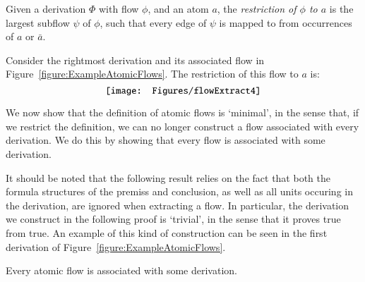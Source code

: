 
\begin{definition}\label{definiton:FlowRestriction}
Given a derivation $\Phi$ with flow $\phi$, and an atom $a$, the \emph{restriction of $\phi$ to $a$} is the largest subflow $\psi$ of $\phi$, such that every edge of $\psi$ is mapped to from occurrences of $a$ or $\bar a$.
\end{definition}

\begin{example}
Consider the rightmost derivation and its associated flow in Figure~\vref{figure:ExampleAtomicFlows}. The restriction of this flow to $a$ is:
\[
\vcenter{\hbox{\texttt{[image: Figures/flowExtract4]}}}
\]
\end{example}


We now show that the definition of atomic flows is `minimal', in the sense that, if we restrict the definition, we can no longer construct a flow associated with every derivation. We do this by showing that every flow is associated with some derivation.


It should be noted that the following result relies on the fact that both the formula structures of the premiss and conclusion, as well as all units occuring in the derivation, are ignored when extracting a flow. In particular, the derivation we construct in the following proof is `trivial', in the sense that it proves true from true. An example of this kind of construction can be seen in the first derivation of Figure~\vref{figure:ExampleAtomicFlows}.

\begin{theorem}\label{theorem:SurjectiveDerToFlow}
Every atomic flow is associated with some derivation.
\end{theorem}

